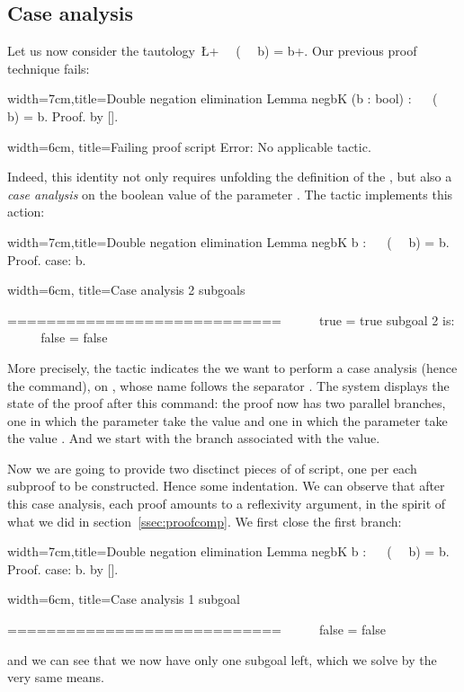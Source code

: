 \subsection{Case analysis}
Let us now consider the tautology~\L+~~ (~~ b) = b+. Our previous
proof technique fails:

\begin{coq}{width=7cm,title=Double negation elimination}
Lemma negbK (b : bool) : ~~ (~~ b) = b.
Proof. by [].
\end{coq}
\begin{coqout}{width=6cm, title=Failing proof script}
Error: No applicable tactic.
\end{coqout}
Indeed, this identity not only requires unfolding the definition of
the , but also a \emph{case analysis} on the boolean value of
the parameter . The tactic  implements this action:

\begin{coq}{width=7cm,title=Double negation elimination}
Lemma negbK b : ~~ (~~ b) = b.
Proof.
case: b.
$~$
$~$
$~$
\end{coq}
\begin{coqout}{width=6cm, title=Case analysis}
2 subgoals

  ============================
   ~~ ~~ true = true
subgoal 2 is:
 ~~ ~~ false = false
\end{coqout}
More precisely, the tactic  indicates the we want to
perform a case analysis (hence the  command), on , whose
name follows the separator \C{:}. The \Coq{} system displays the state
of the proof after this command: the proof now has two parallel
branches, one in which the parameter  take the value  and
one in which the parameter  take the value . And we
start with the branch associated with the  value.

Now we are going to provide two disctinct pieces of of script, one per
each subproof to be constructed. Hence some indentation. We can
observe that after this case analysis, each proof amounts to a
reflexivity argument, in the spirit of what we did in
section~\ref{ssec:proofcomp}. We first close the first branch:

\begin{coq}{width=7cm,title=Double negation elimination}
Lemma negbK b : ~~ (~~ b) = b.
Proof.
case: b.
  by [].
\end{coq}
\begin{coqout}{width=6cm, title=Case analysis}
1 subgoal

 ============================
   ~~ ~~ false = false
\end{coqout}
and we can see that we now have only one subgoal left, which we solve
by the very same means.


